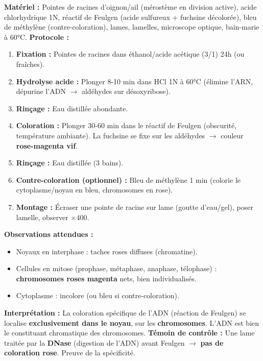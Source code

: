 \documentclass[11pt]{article}
\begin{document}
\begin{experience}
\textbf{Matériel :} Pointes de racines d'oignon/ail (mérostème en division active), acide chlorhydrique 1N, réactif de Feulgen (acide sulfureux + fuchsine décolorée), bleu de méthylène (contre-coloration), lames, lamelles, microscope optique, bain-marie à 60°C.
\textbf{Protocole :}
\begin{enumerate}
    \item \textbf{Fixation :} Pointes de racines dans éthanol/acide acétique (3/1) 24h (ou fraîches).
    \item \textbf{Hydrolyse acide :} Plonger 8-10 min dans HCl 1N à 60°C (élimine l'ARN, dépurine l'ADN $\rightarrow$ aldéhydes sur désoxyribose).
    \item \textbf{Rinçage :} Eau distillée abondante.
    \item \textbf{Coloration :} Plonger 30-60 min dans le réactif de Feulgen (obscurité, température ambiante). La fuchsine se fixe sur les aldéhydes $\rightarrow$ couleur \textbf{rose-magenta vif}.
    \item \textbf{Rinçage :} Eau distillée (3 bains).
    \item \textbf{Contre-coloration (optionnel) :} Bleu de méthylène 1 min (colorie le cytoplasme/noyau en bleu, chromosomes en rose).
    \item \textbf{Montage :} Écraser une pointe de racine sur lame (goutte d'eau/gel), poser lamelle, observer $\times$400.
\end{enumerate}
\textbf{Observations attendues :}
\begin{itemize}
    \item Noyaux en interphase : taches roses diffuses (chromatine).
    \item Cellules en mitose (prophase, métaphase, anaphase, télophase) : \textbf{chromosomes roses magenta} nets, bien individualisés.
    \item Cytoplasme : incolore (ou bleu si contre-coloration).
\end{itemize}
\textbf{Interprétation :} La coloration spécifique de l'ADN (réaction de Feulgen) se localise \textbf{exclusivement dans le noyau}, sur les \textbf{chromosomes}. L'ADN est bien le constituant chromatique des chromosomes.
\textbf{Témoin de contrôle :} Une lame traitée par la \textbf{DNase} (digestion de l'ADN) avant Feulgen $\rightarrow$ \textbf{pas de coloration rose}. Preuve de la spécificité.
\end{experience}
\end{document}
